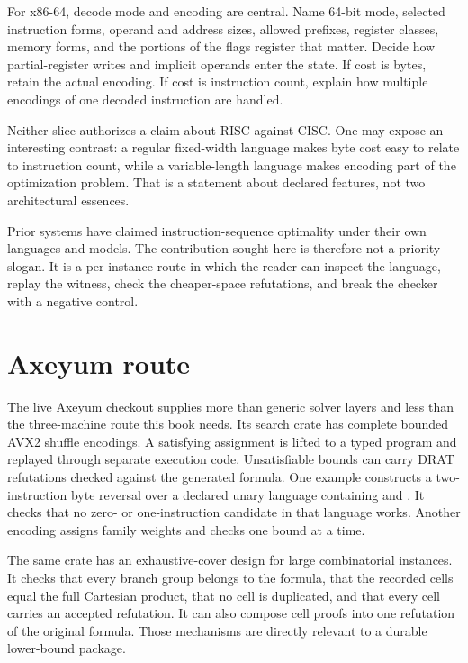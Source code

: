 For x86-64, decode mode and encoding are central. Name 64-bit mode, selected
instruction forms, operand and address sizes, allowed prefixes, register
classes, memory forms, and the portions of the flags register that matter. Decide how
partial-register writes and implicit operands enter the state. If cost is
bytes, retain the actual encoding. If cost is instruction count, explain how
multiple encodings of one decoded instruction are handled.

Neither slice authorizes a claim about RISC against CISC. One may expose an
interesting contrast: a regular fixed-width language makes byte cost easy to
relate to instruction count, while a variable-length language makes encoding
part of the optimization problem. That is a statement about declared
features, not two architectural essences.

Prior systems have claimed instruction-sequence optimality under their own
languages and models.\autocite{bansalaiken2006} The contribution sought here
is therefore not a priority slogan. It is a per-instance route in which the
reader can inspect the language, replay the witness, check the cheaper-space
refutations, and break the checker with a negative control.

\section{Axeyum route}

The live Axeyum checkout supplies more than generic solver layers and less than
the three-machine route this book needs. Its search crate has complete bounded
AVX2 shuffle encodings. A satisfying assignment is lifted to a typed program
and replayed through separate execution code. Unsatisfiable bounds can carry
DRAT refutations checked against the generated formula. One example constructs
a two-instruction byte reversal over a declared unary language containing
 and . It checks that no zero- or
one-instruction candidate in that language works. Another encoding assigns
family weights and checks one bound at a time.

The same crate has an exhaustive-cover design for large combinatorial
instances. It checks that every branch group belongs to the formula, that the
recorded cells equal the full Cartesian product, that no cell is duplicated,
and that every cell carries an accepted refutation. It can also compose cell
proofs into one refutation of the original formula. Those mechanisms are
directly relevant to a durable lower-bound package.

